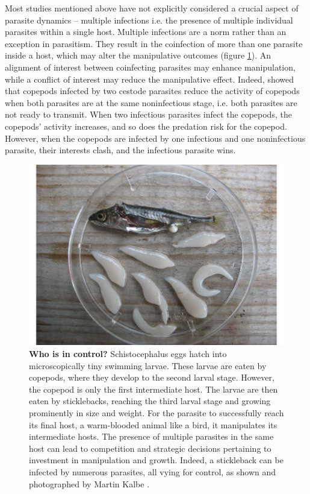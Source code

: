 \documentclass[a4paper]{scrartcl}
\begin{document}
Most studies mentioned above have not explicitly considered a crucial aspect of parasite dynamics -- multiple infections \citep{kalbe:JFB:2002} i.e. the presence of multiple individual parasites within a single host.
Multiple infections are a norm rather than an exception in parasitism. 
They result in the coinfection of more than one parasite inside a host, which may alter the manipulative outcomes (figure \ref{fig:empirical}). 
An alignment of interest between coinfecting parasites may enhance manipulation, while a conflict of interest may reduce the manipulative effect. 
Indeed, \cite{Hafer:2015gl} showed that copepods infected by two cestode parasites reduce the activity of copepods when both parasites are at the same noninfectious stage, i.e. both parasites are not ready to transmit. 
When two infectious parasites infect the copepods, the copepods' activity increases, and so does the predation risk for the copepod. 
However, when the copepods are infected by one infectious and one noninfectious parasite, their interests clash, and the infectious parasite wins. 

\begin{figure}[ht!]
\captionsetup{format=plain}
\centering
\includegraphics[width=0.5\columnwidth]{Figures/Sept_10.pdf}
\caption{\textbf{Who is in control?}
Schistocephalus eggs hatch into microscopically tiny swimming larvae. 
These larvae are eaten by copepods, where they develop to the second larval stage. 
However, the copepod is only the first intermediate host. 
The larvae are then eaten by sticklebacks, reaching the third larval stage and growing prominently in size and weight. 
For the parasite to successfully reach its final host, a warm-blooded animal like a bird, it manipulates its intermediate hosts.
The presence of multiple parasites in the same host can lead to competition and strategic decisions pertaining to investment in manipulation and growth.
Indeed, a stickleback can be infected by numerous parasites, all vying for control, as shown and photographed by Martin Kalbe \citep{kalbe:JFB:2002}.
}
\label{fig:empirical}
\end{figure}
\end{document}
